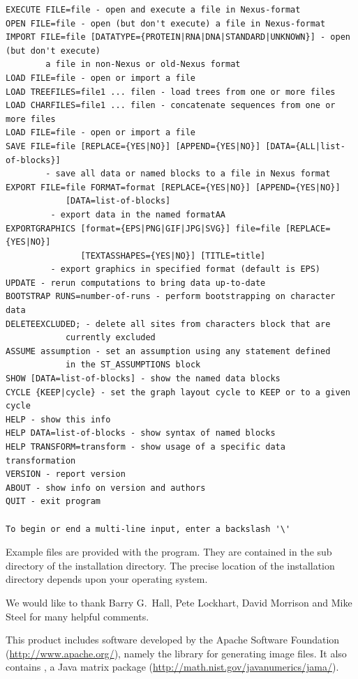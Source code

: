 \documentclass[11pt]{article}
\begin{document}
\begin{verbatim}
EXECUTE FILE=file - open and execute a file in Nexus-format
OPEN FILE=file - open (but don't execute) a file in Nexus-format
IMPORT FILE=file [DATATYPE={PROTEIN|RNA|DNA|STANDARD|UNKNOWN}] - open (but don't execute)
 		a file in non-Nexus or old-Nexus format
LOAD FILE=file - open or import a file
LOAD TREEFILES=file1 ... filen - load trees from one or more files
LOAD CHARFILES=file1 ... filen - concatenate sequences from one or more files
LOAD FILE=file - open or import a file
SAVE FILE=file [REPLACE={YES|NO}] [APPEND={YES|NO}] [DATA={ALL|list-of-blocks}]
        - save all data or named blocks to a file in Nexus format
EXPORT FILE=file FORMAT=format [REPLACE={YES|NO}] [APPEND={YES|NO}]
            [DATA=list-of-blocks]
         - export data in the named formatAA
EXPORTGRAPHICS [format={EPS|PNG|GIF|JPG|SVG}] file=file [REPLACE={YES|NO}]
               [TEXTASSHAPES={YES|NO}] [TITLE=title]
         - export graphics in specified format (default is EPS)
UPDATE - rerun computations to bring data up-to-date
BOOTSTRAP RUNS=number-of-runs - perform bootstrapping on character data
DELETEEXCLUDED; - delete all sites from characters block that are
            currently excluded
ASSUME assumption - set an assumption using any statement defined
            in the ST_ASSUMPTIONS block
SHOW [DATA=list-of-blocks] - show the named data blocks
CYCLE {KEEP|cycle} - set the graph layout cycle to KEEP or to a given cycle
HELP - show this info
HELP DATA=list-of-blocks - show syntax of named blocks
HELP TRANSFORM=transform - show usage of a specific data transformation
VERSION - report version
ABOUT - show info on version and authors
QUIT - exit program

To begin or end a multi-line input, enter a backslash '\'
\end{verbatim}


Example files are provided with the program. They are contained in the
 sub directory of the installation directory. The precise
location of the installation directory depends upon your operating system.


We would like to thank Barry G.~Hall, Pete Lockhart, David Morrison
and Mike Steel for many helpful comments.

This product includes  software developed  by the  Apache Software Foundation
(\url{http://www.apache.org/}), namely the  library for
generating image files. It also contains , a Java matrix
package (\url{http://math.nist.gov/javanumerics/jama/}). 




\printindex
\end{document}

